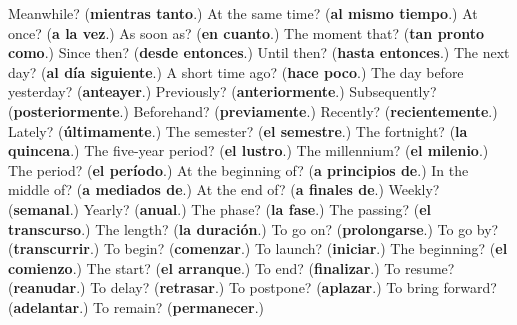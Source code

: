 \begin{tcolorbox}[breakable,colback=teal!4,colframe=teal!35!black,title={Before you move on}]
Meanwhile? (\textbf{mientras tanto}.) At the same time? (\textbf{al mismo tiempo}.) At once? (\textbf{a la vez}.) As soon as? (\textbf{en cuanto}.) The moment that? (\textbf{tan pronto como}.) Since then? (\textbf{desde entonces}.) Until then? (\textbf{hasta entonces}.) The next day? (\textbf{al día siguiente}.) A short time ago? (\textbf{hace poco}.) The day before yesterday? (\textbf{anteayer}.) Previously? (\textbf{anteriormente}.) Subsequently? (\textbf{posteriormente}.) Beforehand? (\textbf{previamente}.) Recently? (\textbf{recientemente}.) Lately? (\textbf{últimamente}.) The semester? (\textbf{el semestre}.) The fortnight? (\textbf{la quincena}.) The five-year period? (\textbf{el lustro}.) The millennium? (\textbf{el milenio}.) The period? (\textbf{el período}.) At the beginning of? (\textbf{a principios de}.) In the middle of? (\textbf{a mediados de}.) At the end of? (\textbf{a finales de}.) Weekly? (\textbf{semanal}.) Yearly? (\textbf{anual}.) The phase? (\textbf{la fase}.) The passing? (\textbf{el transcurso}.) The length? (\textbf{la duración}.) To go on? (\textbf{prolongarse}.) To go by? (\textbf{transcurrir}.) To begin? (\textbf{comenzar}.) To launch? (\textbf{iniciar}.) The beginning? (\textbf{el comienzo}.) The start? (\textbf{el arranque}.) To end? (\textbf{finalizar}.) To resume? (\textbf{reanudar}.) To delay? (\textbf{retrasar}.) To postpone? (\textbf{aplazar}.) To bring forward? (\textbf{adelantar}.) To remain? (\textbf{permanecer}.)
\end{tcolorbox}
